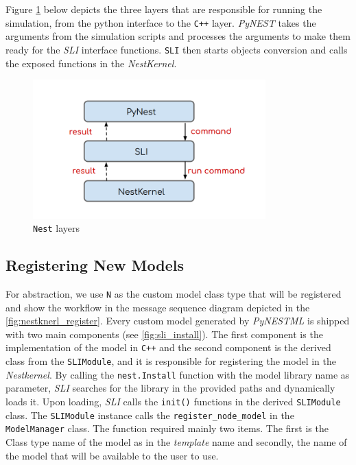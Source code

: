 Figure \ref{fig:layer} below depicts the three layers that are responsible for running the simulation, from the python interface to the \texttt{C++} layer. \emph{PyNEST} takes the arguments from the simulation scripts and processes the arguments to make them ready for the \emph{SLI} interface functions. \texttt{SLI} then starts objects conversion and calls the exposed functions in the \emph{NestKernel}.

\begin{figure}[h!]
\centering
\includegraphics[width=0.8\textwidth]{src/pic/layers.png}
\caption{\texttt{Nest} layers}
\label{fig:layer}
\end{figure}

\subsection{Registering New Models}

For abstraction, we use \texttt{N} as the custom model class type that will be registered and show the workflow in the message sequence diagram depicted in the   \autoref{fig:nestknerl_register}.  Every custom model generated by \emph{PyNESTML} is shipped with two main components (see \autoref{fig:sli_install}). The first component is the implementation of the model in \texttt{C++} and the second component is the derived class from the \texttt{SLIModule}, and it is responsible for registering the model in the \emph{Nestkernel}. By calling the \texttt{nest.Install} function
with the model library name as parameter, \emph{SLI} searches for the library in the provided paths and dynamically loads it. Upon loading, \emph{SLI} calls the \texttt{init()} functions in the derived \texttt{SLIModule} class. The \texttt{SLIModule} instance calls the \texttt{register\_node\_model}  in the \texttt{ModelManager} class. The function required mainly two items. The first is the Class  type name of the model as in the \emph{template} name and secondly, the name of the model that will be available to the user to use. 

